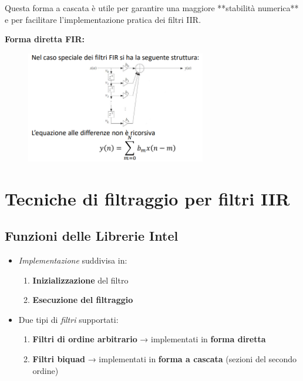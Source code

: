 Questa forma a cascata è utile per garantire una maggiore **stabilità numerica** e per facilitare l’implementazione pratica dei filtri IIR.

\textbf{Forma diretta FIR:}
\begin{figure}[H]
    \centering
    \includegraphics[width=0.7\textwidth]{capitoli/capitolo4/immagini/image2.png}
\end{figure}

\section{Tecniche di filtraggio per filtri IIR}

\subsection{Funzioni delle Librerie Intel}
\begin{itemize}
    \item \textit{Implementazione} suddivisa in:
    \begin{enumerate}
        \item \textbf{Inizializzazione} del filtro
        \item \textbf{Esecuzione del filtraggio}
    \end{enumerate}
    \item Due tipi di \textit{filtri} supportati:
    \begin{enumerate}
        \item \textbf{Filtri di ordine arbitrario} → implementati in \textbf{forma diretta}
        \item \textbf{Filtri biquad} → implementati in \textbf{forma a cascata} (sezioni del secondo ordine)
    \end{enumerate}
\end{itemize}

